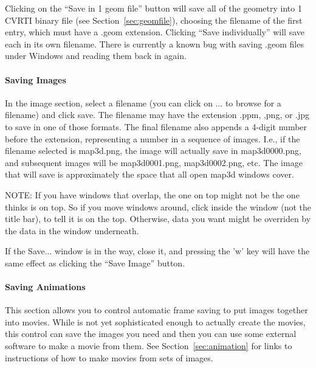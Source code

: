 Clicking on the ``Save in 1 geom file'' button will save all of the
geometry into 1 CVRTI binary file (see Section~\ref{sec:geomfile}),
choosing the filename of the first entry, which must have a .geom
extension.  Clicking ``Save individually'' will save each in its own
filename.  There is currently a known bug with saving .geom files under
Windows and reading them back in again.

\paragraph{Saving Images}
\label{sec:saveimages}

In the image section, select a filename (you can click on ... to browse for
a filename) and click save. The filename may have the extension .ppm, ,png,
or .jpg to save in one of those formats.  The final filename also appends
a 4-digit number before the extension, representing a number in a sequence
of images.  I.e., if the filename selected is map3d.png, the image will
actually save in map3d0000.png, and subsequent images will be map3d0001.png,
map3d0002.png, etc.  The image that will save is
approximately the space that all open map3d windows cover.  

NOTE: If you have
windows that overlap, the one on top might not be the one \map{} thinks is on top.
So if you move windows around, click inside the window (not the title bar),
to tell \map{} it is on the top.  Otherwise, data you want might be overriden
by the data in the window underneath.

If the Save... window is in the way, close it, and pressing the 'w'
key will have the same effect as clicking the ``Save Image'' button. 

\paragraph{Saving Animations}
\label{sec:saveanimations}

This section allows you to control automatic frame saving to put images 
together into movies.  While \map{} is not yet sophisticated enough to 
actually create the movies, this control can save the images you need and
then you can use some external software to make a movie from them.
See Section~\ref{sec:animation} for links to instructions of how to make 
movies from sets of images. 


